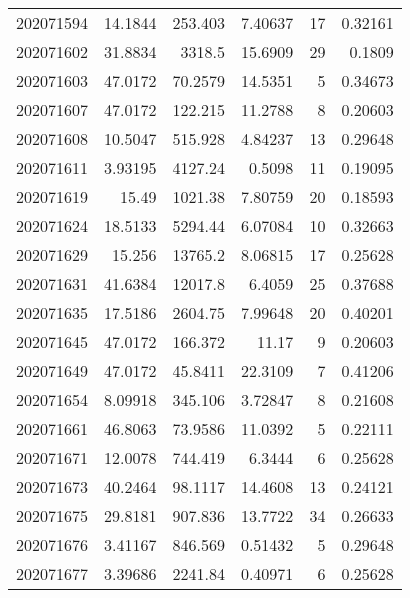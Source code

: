 \begin{tabular}{rrrrrr}
 202071594 &         14.1844  &      253.403  &            7.40637 &          17 & 0.32161 \\
 202071602 &         31.8834  &     3318.5    &           15.6909  &          29 & 0.1809  \\
 202071603 &         47.0172  &       70.2579 &           14.5351  &           5 & 0.34673 \\
 202071607 &         47.0172  &      122.215  &           11.2788  &           8 & 0.20603 \\
 202071608 &         10.5047  &      515.928  &            4.84237 &          13 & 0.29648 \\
 202071611 &          3.93195 &     4127.24   &            0.5098  &          11 & 0.19095 \\
 202071619 &         15.49    &     1021.38   &            7.80759 &          20 & 0.18593 \\
 202071624 &         18.5133  &     5294.44   &            6.07084 &          10 & 0.32663 \\
 202071629 &         15.256   &    13765.2    &            8.06815 &          17 & 0.25628 \\
 202071631 &         41.6384  &    12017.8    &            6.4059  &          25 & 0.37688 \\
 202071635 &         17.5186  &     2604.75   &            7.99648 &          20 & 0.40201 \\
 202071645 &         47.0172  &      166.372  &           11.17    &           9 & 0.20603 \\
 202071649 &         47.0172  &       45.8411 &           22.3109  &           7 & 0.41206 \\
 202071654 &          8.09918 &      345.106  &            3.72847 &           8 & 0.21608 \\
 202071661 &         46.8063  &       73.9586 &           11.0392  &           5 & 0.22111 \\
 202071671 &         12.0078  &      744.419  &            6.3444  &           6 & 0.25628 \\
 202071673 &         40.2464  &       98.1117 &           14.4608  &          13 & 0.24121 \\
 202071675 &         29.8181  &      907.836  &           13.7722  &          34 & 0.26633 \\
 202071676 &          3.41167 &      846.569  &            0.51432 &           5 & 0.29648 \\
 202071677 &          3.39686 &     2241.84   &            0.40971 &           6 & 0.25628 \\

\end{tabular}
